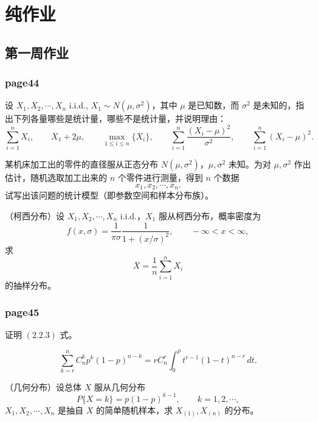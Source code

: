 \chapter{纯作业}
\section{第一周作业}
\subsection*{page44}

\begin{homework}[3]
设 $X_1, X_2, \cdots, X_n$ i.i.d., $X_1 \sim N(\mu,\sigma^2)$，其中 $\mu$ 是已知数，而 $\sigma^2$ 是未知的，指出下列各量哪些是统计量，哪些不是统计量，并说明理由：
\[
\sum_{i=1}^n X_i,\qquad
X_1+2\mu,\qquad
\max_{1\le i\le n}\{X_i\},\qquad
\sum_{i=1}^n \frac{(X_i-\mu)^2}{\sigma^2},\qquad
\sum_{i=1}^n (X_i-\mu)^2.
\]
\end{homework}

\begin{homework}[4]
某机床加工出的零件的直径服从正态分布 $N(\mu,\sigma^2)$，$\mu,\sigma^2$ 未知。为对 $\mu,\sigma^2$ 作出估计，随机选取加工出来的 $n$ 个零件进行测量，得到 $n$ 个数据
\[
x_1,x_2,\cdots,x_n.
\]
试写出该问题的统计模型（即参数空间和样本分布族）。
\end{homework}

\begin{homework}[6]
（柯西分布）设 $X_1,X_2,\cdots,X_n$ i.i.d.，$X_1$ 服从柯西分布，概率密度为
\[
f(x,\sigma)=\frac{1}{\pi\sigma}\frac{1}{1+(x/\sigma)^2},\qquad -\infty<x<\infty,
\]
求
\[
\overline{X}=\frac{1}{n}\sum_{i=1}^n X_i
\]
的抽样分布。
\end{homework}
\subsection*{page45}

\begin{homework}[1]
证明 $(2.2.3)$ 式。

\[
\sum_{k=r}^{n} C_n^k p^k(1-p)^{n-k}
=
rC_n^r\int_0^p t^{r-1}(1-t)^{n-r}\,dt.
\]
\end{homework}

\begin{homework}[2]
（几何分布）设总体 $X$ 服从几何分布
\[
P\{X=k\}=p(1-p)^{k-1},\qquad k=1,2,\cdots,
\]
$X_1,X_2,\cdots,X_n$ 是抽自 $X$ 的简单随机样本，求 $X_{(1)},X_{(n)}$ 的分布。
\end{homework}

